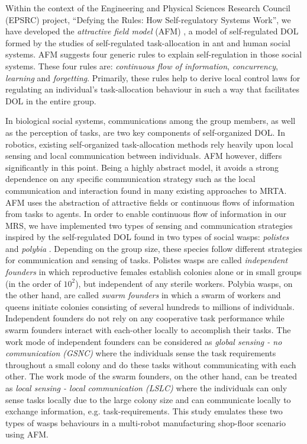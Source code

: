 \documentclass[journal]{IEEEtran}
\begin{document}
Within the context of the Engineering and Physical Sciences Research Council (EPSRC) project, ``Defying the Rules: How Self-regulatory Systems Work'', we have developed the \textit{attractive field model} (AFM) \cite{Arcaute+2008}, a model of self-regulated DOL formed by the studies of self-regulated task-allocation in ant and human social systems. AFM suggests four generic rules to explain self-regulation in those social systems. These four rules are: \textit{continuous flow of information}, \textit{concurrency}, \textit{learning} and \textit{forgetting}. Primarily, these rules help to derive local control laws for regulating an individual's task-allocation behaviour in such a way that facilitates DOL in the entire group.

In biological social systems, communications among the group members, as well as the perception of tasks, are two key components of self-organized DOL. In robotics, existing self-organized task-allocation methods rely heavily upon local sensing and local communication between individuals. AFM however, differs significantly in this point.  Being a highly abstract model, it avoids a strong dependence on any specific communication strategy such as the local communication and interaction found in many existing approaches to MRTA. AFM uses the abstraction of attractive fields or continuous flows of information from tasks to agents. %
In order to enable continuous flow of information in our \acl{MRS}, we have implemented two types of sensing and communication strategies inspired by the self-regulated DOL found in two types of social wasps: {\em polistes} and {\em polybia} \cite{Jeanne1999}. Depending on the group size, these species follow different strategies for communication and sensing of tasks. Polistes wasps are called {\em independent founders} in which reproductive females establish colonies alone or in small groups (in the order of $10^2$), but independent of any sterile workers.  Polybia wasps, on the other hand, are called {\em swarm founders} in which a swarm of workers and queens initiate colonies consisting of several hundreds to millions of individuals.
Independent founders do not rely on any cooperative task performance while swarm founders interact with each-other locally to accomplish their tasks.  The work mode of independent founders can be considered as {\em global sensing - no communication (GSNC)} where the individuals sense the task requirements throughout a small colony and do these tasks without communicating with each other.  The work mode of the swarm founders, on the other hand, can be treated as {\em local sensing - local communication (LSLC)} where the individuals can only sense tasks locally due to the large colony size and can communicate locally to exchange information, e.g. task-requirements.
This study emulates these two types of wasps behaviours in a multi-robot manufacturing shop-floor scenario using AFM.
\end{document}
